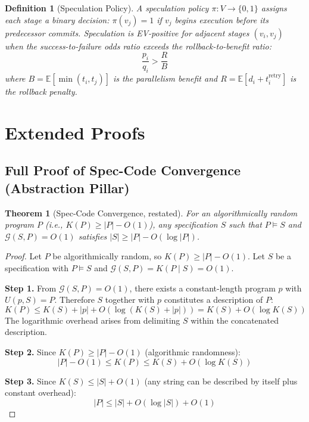 \documentclass[11pt, a4paper, logo, copyright]{googledeepmind}
\newcommand{\E}{\mathbb{E}}
\newtheorem{definition}{Definition}[section]
\newtheorem{theorem}{Theorem}[section]
\begin{document}
\begin{appendices}
\begin{definition}[Speculation Policy]
\label{def:ext-speculation}
A \emph{speculation policy} $\pi: V \to \{0,1\}$ assigns each stage a binary
decision: $\pi(v_j) = 1$ if $v_j$ begins execution before its predecessor commits.
Speculation is EV-positive for adjacent stages $(v_i, v_j)$ when the success-to-failure
odds ratio exceeds the rollback-to-benefit ratio:
\[
  \frac{p_i}{q_i} > \frac{R}{B}
\]
where $B = \E[\min(t_i, t_j)]$ is the parallelism benefit and
$R = \E[d_i + t_i^{\mathrm{retry}}]$ is the rollback penalty.
\end{definition}



\section{Extended Proofs}
\label{app:proofs-extended}

\subsection{Full Proof of Spec-Code Convergence (Abstraction Pillar)}

\begin{theorem}[Spec-Code Convergence, restated]
For an algorithmically random program $P$ (i.e., $K(P) \geq |P| - O(1)$),
any specification $S$ such that $P \models S$ and
$\mathcal{G}(S, P) = O(1)$ satisfies $|S| \geq |P| - O(\log |P|)$.
\end{theorem}

\begin{proof}
Let $P$ be algorithmically random, so $K(P) \geq |P| - O(1)$.
Let $S$ be a specification with $P \models S$ and $\mathcal{G}(S, P) = K(P \mid S) = O(1)$.

\textbf{Step 1.} From $\mathcal{G}(S, P) = O(1)$, there exists a constant-length
program $p$ with $U(p, S) = P$. Therefore $S$ together with $p$ constitutes a
description of $P$:
\[
  K(P) \leq K(S) + |p| + O(\log(K(S) + |p|)) = K(S) + O(\log K(S))
\]
The logarithmic overhead arises from delimiting $S$ within the concatenated description.

\textbf{Step 2.} Since $K(P) \geq |P| - O(1)$ (algorithmic randomness):
\[
  |P| - O(1) \leq K(P) \leq K(S) + O(\log K(S))
\]

\textbf{Step 3.} Since $K(S) \leq |S| + O(1)$ (any string can be described by
itself plus constant overhead):
\[
  |P| \leq |S| + O(\log |S|) + O(1)
\]


\end{proof}
\end{appendices}
\end{document}
